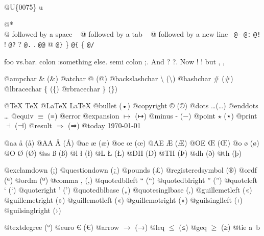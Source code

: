 \documentclass{book}
\renewcommand{\_}{\Texinfounderscore\discretionary{}{}{}}
\begin{document}
\begin{titlepage}
@U\{0075\} u

@* \leavevmode{}\\
@ followed by a space
\ {}
@ followed by a tab
\ {}
@ followed by a new line
\ {}\texttt{@-} \-{}
\texttt{@:} \@
\texttt{@!} \@!
\texttt{@?} \@?
\texttt{@.} \@.
\texttt{@@} @
\texttt{@\}} \}
\texttt{@\{} \{
\texttt{@/} 

foo vs.\@ bar. 
colon :\@And something else.
semi colon ;\@.
And ? ?\@.
Now ! !\@@
but , ,\@

@ampchar \& (\&)
@atchar @ (@)
@backslashchar \textbackslash{} (\textbackslash{})
@hashchar \# (\#)
@lbracechar \{ (\{)
@rbracechar \} (\})

@TeX \TeX{}
@LaTeX \LaTeX{}
@bullet \textbullet{} (•)
@copyright \copyright{} (©)
@dots \dots{}\@ (…)
@enddots \dots{}
@equiv $\equiv{}$ (≡)
@error 
@expansion $\mapsto{}$ (↦)
@minus - (−)
@point $\star{}$ (⋆)
@print $\dashv{}$ (⊣)
@result $\Rightarrow{}$ (⇒)
@today \today{}

@aa \aa{} (å)
@AA \AA{} (Å)
@ae \ae{} (æ)
@oe \oe{} (œ)
@AE \AE{} (Æ)
@OE \OE{} (Œ)
@o \o{} (ø)
@O \O{} (Ø)
@ss \ss{} (ß)
@l \l{} (ł)
@L \L{} (Ł)
@DH \DH{} (Ð)
@TH \TH{} (Þ)
@dh \dh{} (ð)
@th \th{} (þ)

@exclamdown \textexclamdown{} (¡)
@questiondown \textquestiondown{} (¿)
@pounds \textsterling{} (£)
@registeredsymbol \circledR{} (®)
@ordf \textordfeminine{} (ª)
@ordm \textordmasculine{} (º)
@comma , (,)
@quotedblleft \textquotedblleft{} (“)
@quotedblright \textquotedblright{} (”)
@quoteleft \textquoteleft{} (‘)
@quoteright \textquoteright{} (’)
@quotedblbase \quotedblbase{} („)
@quotesinglbase \quotesinglbase{} (‚)
@guillemetleft \guillemotleft{} («)
@guillemetright \guillemotright{} (»)
@guillemotleft \guillemotleft{} («)
@guillemotright \guillemotright{} (»)
@guilsinglleft \guilsinglleft{} (‹)
@guilsinglright \guilsinglright{} (›)

@textdegree \textdegree{} (°)
@euro \euro{} (€)
@arrow $\rightarrow{}$ (→)
@leq $\leq{}$ (≤)
@geq $\geq{}$ (≥)
@tie a~b


\end{titlepage}
\end{document}
